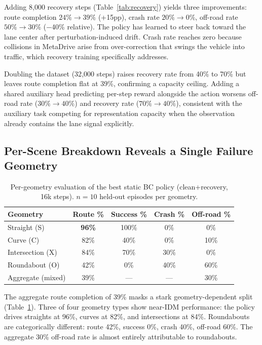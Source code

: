 \documentclass{article}
\begin{document}
Adding 8{,}000 recovery steps (Table~\ref{tab:recovery}) yields three
improvements: route completion $24\%\to39\%$ (+15pp), crash rate
$20\%\to0\%$, off-road rate $50\%\to30\%$ ($-$40\% relative). The policy
has learned to steer back toward the lane center after perturbation-induced
drift. Crash rate reaches zero because collisions in MetaDrive arise from
over-correction that swings the vehicle into traffic, which recovery training
specifically addresses.

Doubling the dataset (32{,}000 steps) raises recovery rate from 40\% to 70\%
but leaves route completion flat at 39\%, confirming a capacity ceiling.
Adding a shared auxiliary head predicting per-step reward alongside the
action worsens off-road rate ($30\%\to40\%$) and recovery rate
($70\%\to40\%$), consistent with the auxiliary task competing for
representation capacity when the observation already contains the lane signal
explicitly.

\subsection{Per-Scene Breakdown Reveals a Single Failure Geometry}
\label{sec:perscene}

\begin{table}[t]
\centering
\caption{
  Per-geometry evaluation of the best static BC policy (clean+recovery,
  16k steps). $n{=}10$ held-out episodes per geometry.
}
\label{tab:perscene}
\small
\begin{tabular}{lcccc}
\toprule
Geometry & Route \% & Success \% & Crash \% & Off-road \% \\
\midrule
Straight (S)     & \textbf{96\%} & 100\% & 0\%  & 0\%  \\
Curve (C)        & 82\%          &  40\% & 0\%  & 10\% \\
Intersection (X) & 84\%          &  70\% & 30\% & 0\%  \\
Roundabout (O)   & 42\%          &   0\% & 40\% & 60\% \\
\midrule
Aggregate (mixed) & 39\% & --- & --- & 30\% \\
\bottomrule
\end{tabular}
\end{table}

The aggregate route completion of 39\% masks a stark geometry-dependent
split (Table~\ref{tab:perscene}). Three of four geometry types show near-IDM
performance: the policy drives straights at 96\%, curves at 82\%, and
intersections at 84\%. Roundabouts are categorically different: route 42\%,
success 0\%, crash 40\%, off-road 60\%. The aggregate 30\% off-road rate is
almost entirely attributable to roundabouts.
\end{document}
